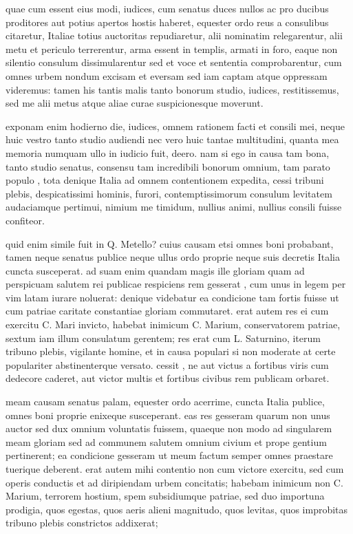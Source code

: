  quae cum essent eius modi, iudices, cum senatus duces nullos ac pro ducibus proditores aut potius apertos hostis haberet, equester ordo reus a consulibus citaretur, Italiae totius auctoritas repudiaretur, alii nominatim relegarentur, alii metu et periculo terrerentur, arma essent in templis, armati in foro, eaque non silentio consulum dissimularentur sed et voce et sententia comprobarentur, cum omnes urbem nondum excisam et eversam sed iam captam atque oppressam videremus: tamen his tantis malis tanto bonorum studio, iudices, restitissemus, sed me alii metus atque aliae curae suspicionesque moverunt.

 exponam enim hodierno die, iudices, omnem rationem facti et consili mei, neque huic vestro tanto studio audiendi nec vero huic tantae multitudini, quanta mea memoria numquam ullo in iudicio fuit, deero. nam si ego in causa tam bona, tanto studio senatus, consensu tam incredibili bonorum omnium, tam parato populo , tota denique Italia ad omnem contentionem expedita, cessi tribuni plebis, despicatissimi hominis, furori, contemptissimorum consulum levitatem audaciamque pertimui, nimium me timidum, nullius animi, nullius consili fuisse confiteor.

 quid enim simile fuit in Q. Metello? cuius causam etsi omnes boni probabant, tamen neque senatus publice neque ullus ordo proprie neque suis decretis Italia cuncta susceperat. ad suam enim quandam magis ille gloriam quam ad perspicuam salutem rei publicae respiciens rem gesserat , cum unus in legem per vim latam iurare noluerat: denique videbatur ea condicione tam fortis fuisse ut cum patriae caritate constantiae gloriam commutaret. erat autem res ei cum exercitu C. Mari invicto, habebat inimicum C. Marium, conservatorem patriae, sextum iam illum consulatum gerentem; res erat cum L. Saturnino, iterum tribuno plebis, vigilante homine, et in causa populari si non moderate at certe populariter abstinenterque versato. cessit , ne aut victus a fortibus viris cum dedecore caderet, aut victor multis et fortibus civibus rem publicam orbaret.

 meam causam senatus palam, equester ordo acerrime, cuncta Italia publice, omnes boni proprie enixeque susceperant. eas res gesseram quarum non unus auctor sed dux omnium voluntatis fuissem, quaeque non modo ad singularem meam gloriam sed ad communem salutem omnium civium et prope gentium pertinerent; ea condicione gesseram ut meum factum semper omnes praestare tuerique deberent. erat autem mihi contentio non cum victore exercitu, sed cum operis conductis et ad diripiendam urbem concitatis; habebam inimicum non C. Marium, terrorem hostium, spem subsidiumque patriae, sed duo importuna prodigia, quos egestas, quos aeris alieni magnitudo, quos levitas, quos improbitas tribuno plebis constrictos addixerat;

